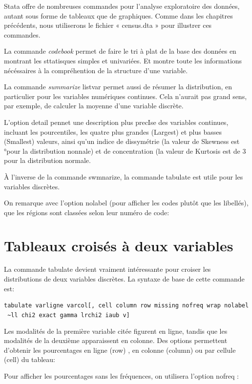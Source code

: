 \documentclass[
]{book}
\theoremstyle{definition}
\theoremstyle{definition}
\theoremstyle{definition}
\theoremstyle{definition}
\theoremstyle{remark}
\begin{document}
Stata offre de nombreuses commandes pour l'analyse
exploratoire des données, autant sous forme de tableaux que de
graphiques. Comme dans les chapitres précédents, nous
utiliserons le fichier « census.dta » pour illustrer ces
commandes.

La commande \emph{codebook} permet de faire le tri à plat de la base des données en montrant les sttatisques simples et univariées. Et montre toute les informations nécéssaires à la compréhention de la structure d'une variable.

La commande \emph{summarize} listvar permet aussi de résumer
la distribution, en particulier pour les variables numériques
continues. Cela n'aurait pas grand sens, par exemple, de calculer
la moyenne d'une variable discrète.

L'option detail pennet une description plus precIse des
variables continues, incluant les pourcentiles, les quatre plus
grandes (Largest) et plus basses (Smallest) valeurs, ainsi
qu'un indice de dissymétrie (la valeur de Skewness est °pour
la distribution nonnale) et de concentration (la valeur de
Kurtosis est de 3 pour la distribution normale.

À l'inverse de la commande swmnarize, la commande tabulate est utile pour les variables discrètes.

On remarque avec l'option nolabel (pour afficher les codes plutôt que les libellés), que les régions sont classées selon leur numéro de code:

\hypertarget{tableaux-croisuxe9s-uxe0-deux-variables}{%
\section{Tableaux croisés à deux variables}\label{tableaux-croisuxe9s-uxe0-deux-variables}}

La commande tabulate devient vraiment intéressante pour croiser les distributions de deux variables discrètes. La syntaxe de base de cette commande est:

\texttt{tabulate\ varligne\ varcol{[},\ cell\ column\ row\ missing\ nofreq\ wrap\ nolabel\ \textasciitilde{}ll\ chi2\ exact\ gamma\ lrchi2\ iaub\ v{]}}

Les modalités de la première variable citée figurent en ligne, tandis que les modalités de la deuxième apparaissent en colonne. Des options permettent d'obtenir les pourcentages en ligne (row) , en colonne (column) ou par cellule (cell) du tableau:

Pour afficher les pourcentages sans les fréquences, on utilisera l'option nofreq :
\end{document}
